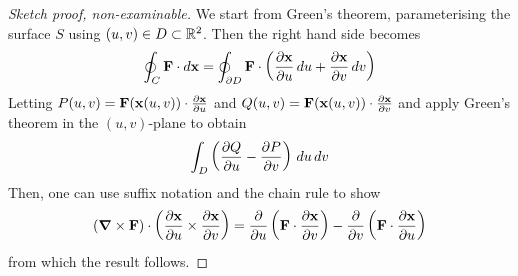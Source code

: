 \documentclass{../../template/note}
\begin{document}
    \begin{proof}[Sketch proof, non-examinable]
        We start from Green's theorem, parameterising the surface \(S\) using \((u, v) \in D \subset \mathbb R^2\). Then the right hand side becomes
        \begin{align*}
            \oint_C \V F \cdot d\V x = \oint_{\pr D} \V F \cdot \left(\pd{\V x} u \D u + \pd{\V x}v \D v\right)
        \end{align*}
        Letting \(P(u, v) = \V F(\V x(u, v)) \cdot \pd{\V x}u\) and \(Q(u, v) = \V F(\V x(u, v)) \cdot \pd{\V x}v\) and apply Green's theorem in the \((u, v)\)-plane to obtain
        \begin{align*}
            \int_D \left(\pd Q u - \pd P v\right) \D u \D v
        \end{align*}
        Then, one can use suffix notation and the chain rule to show
        \begin{align*}
            (\curl \V F) \cdot \left(\pd{\V x}u \times \pd{\V x}v\right) = \pd{}{u} \left(\V F \cdot \pd{\V x}v \right) - \pd{}{v} \left(\V F \cdot \pd{\V x}u\right)
        \end{align*}
        from which the result follows.
    \end{proof}
    
\end{document}
